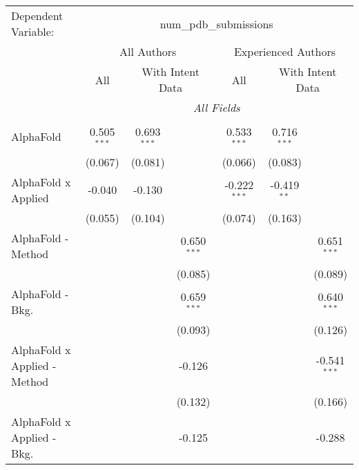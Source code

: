 \begingroup
\centering
\begin{tabular}{lcccccc}
   \tabularnewline \midrule \midrule
   Dependent Variable: & \multicolumn{6}{c}{num\_pdb\_submissions}\\
 & \multicolumn{3}{c}{All Authors} & \multicolumn{3}{c}{Experienced Authors} \\
\cmidrule(lr){2-4} \cmidrule(lr){5-7}
 & \multicolumn{1}{c}{All} & \multicolumn{2}{c}{With Intent Data} & \multicolumn{1}{c}{All} & \multicolumn{2}{c}{With Intent Data} \\
\cmidrule(lr){2-2} \cmidrule(lr){3-4} \cmidrule(lr){5-5} \cmidrule(lr){6-7}
 & \multicolumn{6}{c}{\textit{All Fields}} \\ \\
   AlphaFold                      & 0.505$^{***}$ & 0.693$^{***}$ &                & 0.533$^{***}$  & 0.716$^{***}$ &   \\   
                                  & (0.067)       & (0.081)       &                & (0.066)        & (0.083)       &   \\   
   AlphaFold x Applied            & -0.040        & -0.130        &                & -0.222$^{***}$ & -0.419$^{**}$ &   \\   
                                  & (0.055)       & (0.104)       &                & (0.074)        & (0.163)       &   \\   
   AlphaFold - Method             &               &               & 0.650$^{***}$  &                &               & 0.651$^{***}$\\   
                                  &               &               & (0.085)        &                &               & (0.089)\\   
   AlphaFold - Bkg.               &               &               & 0.659$^{***}$  &                &               & 0.640$^{***}$\\   
                                  &               &               & (0.093)        &                &               & (0.126)\\   
   AlphaFold x Applied - Method   &               &               & -0.126         &                &               & -0.541$^{***}$\\   
                                  &               &               & (0.132)        &                &               & (0.166)\\   
   AlphaFold x Applied - Bkg.     &               &               & -0.125         &                &               & -0.288\\   

\end{tabular}
